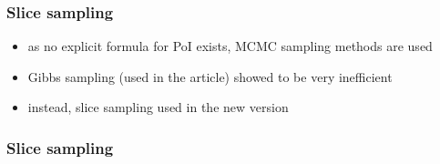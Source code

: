 \documentclass[sans,mathserif]{beamer}
\begin{document}
\begin{frame}
  \frametitle{Slice sampling}
  \begin{itemize}
    \item as no explicit formula for PoI exists, MCMC sampling methods are used
    \item Gibbs sampling (used in the article) showed to be very inefficient
    \item instead, \alert{slice sampling} used in the new version
  \end{itemize}
\end{frame}

\begin{frame}
  \frametitle{Slice sampling}
\end{frame}
\end{document}
